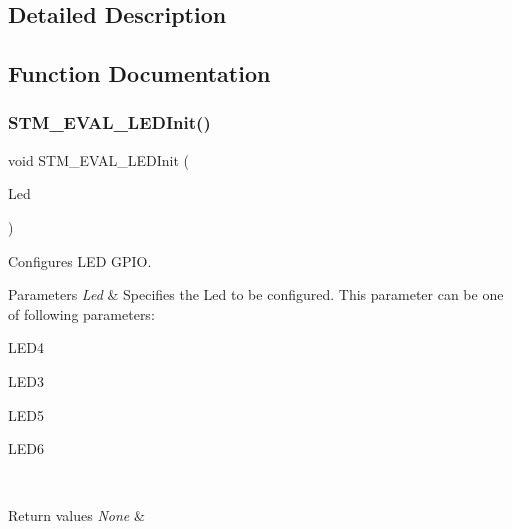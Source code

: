 \subsection{Detailed Description}


\subsection{Function Documentation}
\mbox{\label{group__STM32F4__DISCOVERY__LOW__LEVEL__Private__Functions_ga01e1a245e786705357f741c8d42cbd3a}} 
\subsubsection{S\+T\+M\+\_\+\+E\+V\+A\+L\+\_\+\+L\+E\+D\+Init()}
{\footnotesize\ttfamily void S\+T\+M\+\_\+\+E\+V\+A\+L\+\_\+\+L\+E\+D\+Init (\begin{DoxyParamCaption}\item[{\textbf{ Led\+\_\+\+Type\+Def}}]{Led }\end{DoxyParamCaption})}



Configures L\+ED G\+P\+IO. 


\begin{DoxyParams}{Parameters}
{\em Led} & Specifies the Led to be configured. This parameter can be one of following parameters\+: \begin{DoxyItemize}
\item L\+E\+D4 \item L\+E\+D3 \item L\+E\+D5 \item L\+E\+D6 \end{DoxyItemize}
\\
\hline
\end{DoxyParams}

\begin{DoxyRetVals}{Return values}
{\em None} & \\
\hline
\end{DoxyRetVals}


